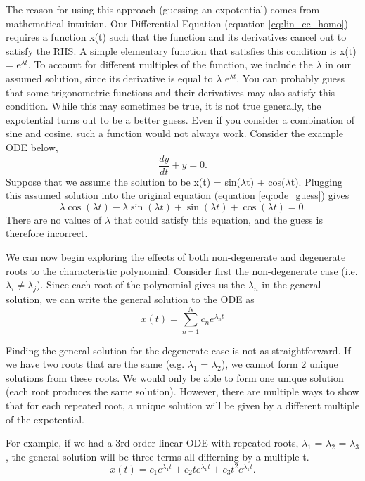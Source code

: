 \documentclass{article}
\newcommand{\be}{\begin{equation}}
\newcommand{\ee}{\end{equation}}
\begin{document}
The reason for using this approach (guessing an expotential) comes from mathematical intuition.
Our Differential Equation (equation \ref{eq:lin_cc_homo}) requires a function x(t) such that the function and its derivatives cancel out to satisfy the RHS.
A simple elementary function that satisfies this condition is x(t) = e$^{\lambda t}$.
To account for different multiples of the function, we include the $\lambda$ in our assumed solution, since its derivative is equal to $\lambda$ e$^{\lambda t}$.
You can probably guess that some trigonometric functions and their derivatives may also satisfy this condition.
While this may sometimes be true, it is not true generally, the expotential turns out to be a better guess.
Even if you consider a combination of sine and cosine, such a function would not always work.
Consider the example ODE below,
\be \label{eq:ode_guess}
\frac{dy}{dt} + y = 0 .
\ee
Suppose that we assume the solution to be x(t) = sin($\lambda$t) + cos($\lambda$t).
Plugging this assumed solution into the original equation (equation \ref{eq:ode_guess}) gives
\be
\lambda \cos(\lambda t) - \lambda \sin(\lambda t) + \sin(\lambda t) + \cos(\lambda t) = 0 .
\ee
There are no values of $\lambda$ that could satisfy this equation, and the guess is therefore incorrect.

We can now begin exploring the effects of both non-degenerate and degenerate roots to the characteristic polynomial.
Consider first the non-degenerate case (i.e. $\lambda_i \neq \lambda_j$).
Since each root of the polynomial gives us the $\lambda_n$ in the general solution, we can write the general solution to the ODE as
\be
x(t) = \sum_{n=1}^N c_n e^{\lambda_n t}
\ee

Finding the general solution for the degenerate case is not as straightforward.
If we have two roots that are the same (e.g. $\lambda_1$ = $\lambda_2$), we cannot form 2 unique solutions from these roots.
We would only be able to form one unique solution (each root produces the same solution).
However, there are multiple ways to show that for each repeated root, a unique solution will be given by a different multiple of the expotential.

For example, if we had a 3rd order linear ODE with repeated roots, $\lambda_1$ = $\lambda_2$ = $\lambda_3$, the general solution will be three terms all differning by a multiple t.
\be
x(t) = c_1 e^{\lambda_1 t} + c_2 t e^{\lambda_1 t} + c_3 t^2 e^{\lambda_1 t} .
\ee
\end{document}
